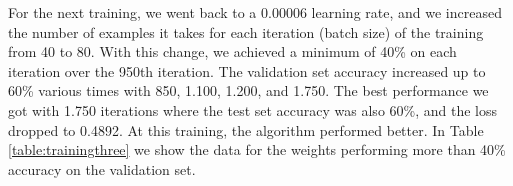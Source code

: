 \begin{table}[!ht]
\begin{center}
\end{center}
\caption{Results from the second training in version four of the pictogram identification algorithm.}
\label{table:trainingtwo}
\end{table}

For the next training, we went back to a 0.00006 learning rate, and we increased the number of examples it takes for each iteration (batch size) of the training from 40 to 80. With this change, we achieved a minimum of 40\% on each iteration over the 950th iteration. The validation set accuracy increased up to 60\% various times with 850, 1.100, 1.200, and 1.750. The best performance we got with 1.750 iterations where the test set accuracy was also 60\%, and the loss dropped to 0.4892. At this training, the algorithm performed better. In Table \ref{table:trainingthree} we show the data for the weights performing more than 40\% accuracy on the validation set.


